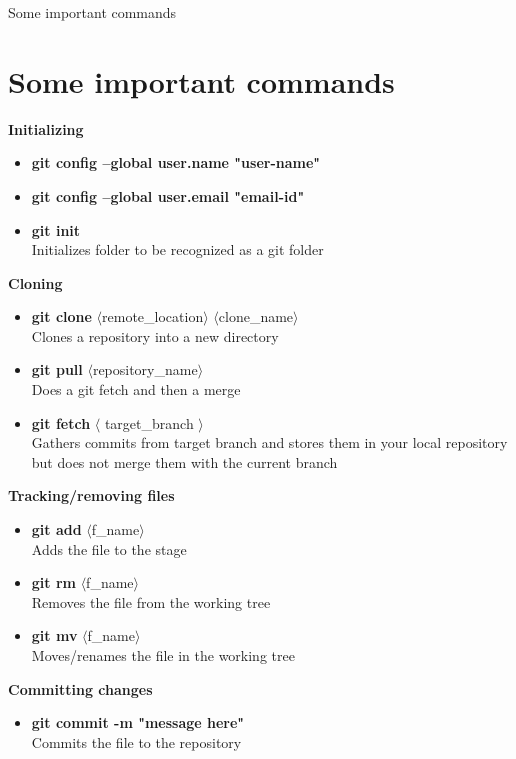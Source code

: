 \documentclass{beamer}
\begin{document}
\begin{frame}[allowframebreaks]{Some important commands}
\section{Some important commands}
\textbf{Initializing}
	\begin{itemize}
		\item {\textbf{git config --global user.name "user-name"}}
		\item {\textbf{git config --global user.email "email-id"}}
		\item {\textbf{git init} \\ Initializes folder to be recognized as a git folder}
	\end{itemize}

	\textbf{Cloning}
	\begin{itemize}
	\item {\textbf{git clone} $\langle$remote\_location$\rangle$ $\langle$clone\_name$\rangle$ \\ Clones a repository into a new directory}
	\item {\textbf{git pull }$\langle$repository\_name$\rangle$\\Does a git fetch and then a merge}
	\item {\textbf{git fetch }$\langle$ target\_branch $\rangle$ \\Gathers commits from target branch and stores them in your local repository but does not merge them with the current branch }	
	\end{itemize}
	
	\framebreak
	\textbf{Tracking/removing files}
	\begin{itemize}
	\item {\textbf{git add} $\langle$f\_name$\rangle$\\ Adds the file to the stage}
	\item {\textbf{git rm} $\langle$f\_name$\rangle$\\ Removes the file from the working tree}
	\item {\textbf{git mv} $\langle$f\_name$\rangle$\\ Moves/renames the file in the working tree}
	\end{itemize}

	\textbf{Committing changes}
	\begin{itemize}
	\item {\textbf{git commit -m "message here"} \\ Commits the file to the repository} 
	\end{itemize}


\end{frame}
\end{document}
